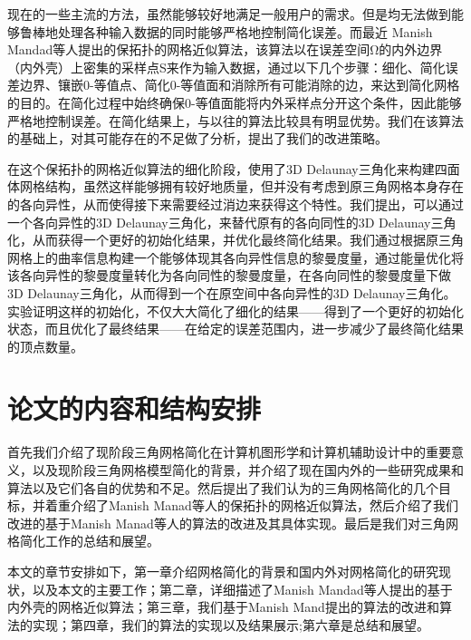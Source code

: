现在的一些主流的方法，虽然能够较好地满足一般用户的需求。但是均无法做到能够鲁棒地处理各种输入数据的同时能够严格地控制简化误差。而最近 Manish Mandad等人提出的保拓扑的网格近似算法\cite{isotopic-appro}，该算法以在误差空间Ω的内外边界（内外壳）上密集的采样点S来作为输入数据，通过以下几个步骤：细化、简化误差边界、镶嵌0-等值点、简化0-等值面和消除所有可能消除的边，来达到简化网格的目的。在简化过程中始终确保0-等值面能将内外采样点分开这个条件，因此能够严格地控制误差。在简化结果上，与以往的算法比较具有明显优势。我们在该算法的基础上，对其可能存在的不足做了分析，提出了我们的改进策略。

在这个保拓扑的网格近似算法的细化阶段，使用了3D Delaunay三角化来构建四面体网格结构，虽然这样能够拥有较好地质量，但并没有考虑到原三角网格本身存在的各向异性，从而使得接下来需要经过消边来获得这个特性。我们提出，可以通过一个各向异性的3D Delaunay三角化，来替代原有的各向同性的3D Delaunay三角化，从而获得一个更好的初始化结果，并优化最终简化结果。我们通过根据原三角网格上的曲率信息构建一个能够体现其各向异性信息的黎曼度量，通过能量优化将该各向异性的黎曼度量转化为各向同性的黎曼度量，在各向同性的黎曼度量下做3D Delaunay三角化，从而得到一个在原空间中各向异性的3D Delaunay三角化。实验证明这样的初始化，不仅大大简化了细化的结果——得到了一个更好的初始化状态，而且优化了最终结果——在给定的误差范围内，进一步减少了最终简化结果的顶点数量。

\section{论文的内容和结构安排}
首先我们介绍了现阶段三角网格简化在计算机图形学和计算机辅助设计中的重要意义，以及现阶段三角网格模型简化的背景，并介绍了现在国内外的一些研究成果和算法以及它们各自的优势和不足。然后提出了我们认为的三角网格简化的几个目标，并着重介绍了Manish Manad等人的保拓扑的网格近似算法，然后介绍了我们改进的基于Manish Manad等人的算法的改进及其具体实现。最后是我们对三角网格简化工作的总结和展望。\par
本文的章节安排如下，第一章介绍网格简化的背景和国内外对网格简化的研究现状，以及本文的主要工作；第二章，详细描述了Manish Mandad等人提出的基于内外壳的网格近似算法；第三章，我们基于Manish Mand提出的算法的改进和算法的实现；第四章，我们的算法的实现以及结果展示;第六章是总结和展望。
